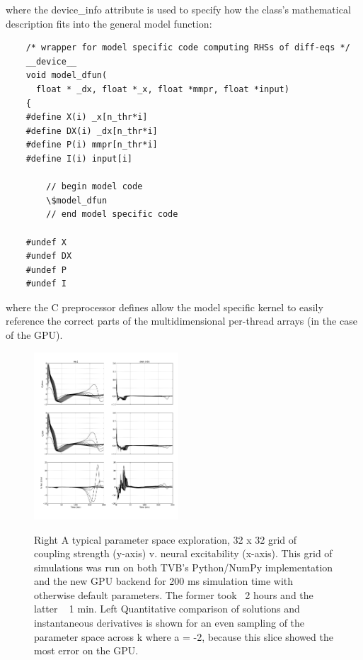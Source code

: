 	\noindent where the device\_info attribute is used to specify how the
	class's mathematical description fits into the general model function:

	\begin{lstlisting}
	/* wrapper for model specific code computing RHSs of diff-eqs */
	__device__
	void model_dfun(
	  float * _dx, float *_x, float *mmpr, float *input)
	{
	#define X(i) _x[n_thr*i]
	#define DX(i) _dx[n_thr*i]
	#define P(i) mmpr[n_thr*i]
	#define I(i) input[i]

	    // begin model code
	    \$model_dfun
	    // end model specific code

	#undef X
	#undef DX
	#undef P
	#undef I
	\end{lstlisting}

	\noindent where the C preprocessor defines allow the model specific
	kernel to easily reference the correct parts of the multidimensional 
	per-thread arrays (in the case of the GPU). 

	 \begin{figure}
		{\includegraphics[width=0.48\textwidth]{images/gpu_dxdt.png}}
		\caption{
		Right A typical parameter space exploration, 32 x 32 grid of
		coupling strength (y-axis) v. neural excitability (x-axis).
		This grid of simulations was run on both TVB's Python/NumPy
		implementation and the new GPU backend for 200 ms simulation
		time with otherwise default parameters. The former took ~2
		hours and the latter ~ 1 min. Left Quantitative comparison of
		solutions and instantaneous derivatives is shown for an even
		sampling of the parameter space across k where a = -2, because
		this slice showed the most error on the GPU. 	
		}
		\label{fig:gpu_dxdt}
	\end{figure}

